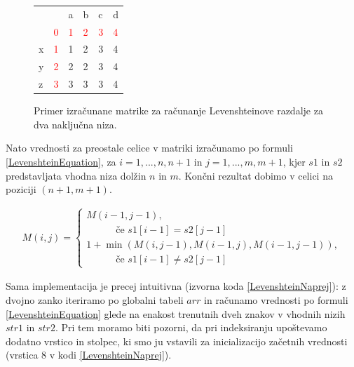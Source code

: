 \documentclass[a4paper,12pt,openright]{book}
\begin{document}
\begin{figure}[htb]
\centering
\begin{tabular}{|l|l|l|l|l|l|}
\cline{3-6}
  \multicolumn{2}{c|}{}  & a & b & c & d\\ \cline{2-6}
 \multicolumn{1}{c|}{} & \textcolor{red}{0} & \textcolor{red}{1} & \textcolor{red}{2} & \textcolor{red}{3} & \textcolor{red}{4}\\ \hline
x  & \textcolor{red}{1}  & \cellcolor{blue!15}1 &  2 & 3 & 4\\ \hline
y  & \textcolor{red}{2} & 2 & \cellcolor{blue!15}2 & 3 & 4\\ \hline
z  & \textcolor{red}{3} & 3 & 3 & \cellcolor{blue!15}3 & \cellcolor{blue!25}4 \\ \hline
\end{tabular}
\caption{Primer izračunane matrike za računanje Levenshteinove razdalje za dva naključna niza.}
\label{levenshteinExample}
\end{figure}

Nato vrednosti za preostale celice v matriki izračunamo po formuli \ref{LevenshteinEquation}, za $i=1,...,n,n+1$ in $j=1,...,m,m+1$, kjer $s1$ in $s2$ predstavljata vhodna niza dolžin $n$ in $m$. Končni rezultat dobimo v celici na poziciji $(n+1, m+1)$. 

\bigskip \bigskip

\begin{equation}
\label{LevenshteinEquation}
\begin{aligned}
M(i, j) =
\begin{cases}
     M(i-1, j-1) ,     \\ \quad \quad \quad \text{če } s1[i-1]=s2[j-1]\\
     1 + \min(M(i, j-1), M(i-1, j), M(i-1, j-1)) , \\ \quad \quad \quad \text{če } s1[i-1] \neq s2[j-1]
  \end{cases}
\end{aligned}
\end{equation}

\bigskip \bigskip

Sama implementacija je precej intuitivna (izvorna koda \ref{LevenshteinNaprej}): z dvojno zanko iteriramo po globalni tabeli $arr$ in računamo vrednosti po formuli \ref{LevenshteinEquation} glede na enakost trenutnih dveh znakov v vhodnih nizih $str1$ in $str2$. Pri tem moramo biti pozorni, da pri indeksiranju upoštevamo dodatno vrstico in stolpec, ki smo ju vstavili za inicializacijo začetnih vrednosti (vrstica 8 v kodi \ref{LevenshteinNaprej}). \bigskip \bigskip
\end{document}
